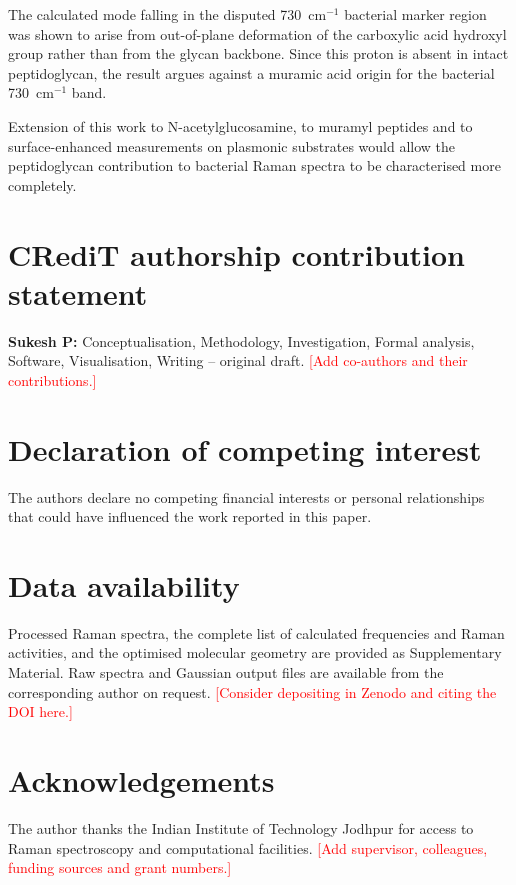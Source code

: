 \documentclass[11pt,a4paper]{article}
\newcommand{\wn}{\ensuremath{\mathrm{cm}^{-1}}}
\newcommand{\authorcheck}[1]{\textcolor{red}{[#1]}}
\begin{document}
The calculated mode falling in the disputed 730~\wn{} bacterial marker region
was shown to arise from out-of-plane deformation of the carboxylic acid
hydroxyl group rather than from the glycan backbone. Since this proton is
absent in intact peptidoglycan, the result argues against a muramic acid
origin for the bacterial 730~\wn{} band.

Extension of this work to N-acetylglucosamine, to muramyl peptides and to
surface-enhanced measurements on plasmonic substrates would allow the
peptidoglycan contribution to bacterial Raman spectra to be characterised
more completely.

\section*{CRediT authorship contribution statement}
\textbf{Sukesh P:} Conceptualisation, Methodology, Investigation, Formal
analysis, Software, Visualisation, Writing -- original draft.
\authorcheck{Add co-authors and their contributions.}

\section*{Declaration of competing interest}
The authors declare no competing financial interests or personal
relationships that could have influenced the work reported in this paper.

\section*{Data availability}
Processed Raman spectra, the complete list of calculated frequencies and
Raman activities, and the optimised molecular geometry are provided as
Supplementary Material. Raw spectra and Gaussian output files are available
from the corresponding author on request. \authorcheck{Consider depositing in
Zenodo and citing the DOI here.}

\section*{Acknowledgements}
The author thanks the Indian Institute of Technology Jodhpur for access to
Raman spectroscopy and computational facilities.
\authorcheck{Add supervisor, colleagues, funding sources and grant numbers.}
\end{document}
